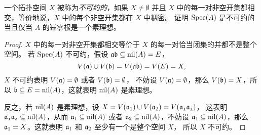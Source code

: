 \begin{problem}
  一个拓扑空间 $X$ 被称为\emph{不可约的}，如果 $X\neq\emptyset$ 并且 $X$
  中的每一对非空开集都相交，等价地说，$X$ 中的每个非空开集都在 $X$ 中稠密。
  证明 $\operatorname{Spec}(A)$ 是不可约的当且仅当 $A$ 的幂零根是一个素理想。
\end{problem}
\begin{proof}
  $X$ 中的每一对非空开集都相交等价于 $X$ 的每一对恰当闭集的并都不是整个空间。
  若 $\operatorname{Spec}(A)$ 不可约，假设 $\mathfrak{ab}\subseteq\operatorname{nil}(A)=E$，
  \[
    V(\mathfrak{a})\cup V(\mathfrak{b})=V(\mathfrak{ab})= V(E)=X,  
  \]
  $X$ 不可约表明 $V(\mathfrak{a})=\emptyset$ 或者 $V(\mathfrak{b})=\emptyset$，
  不妨设 $V(\mathfrak{a})=\emptyset$，那么 $V(\mathfrak{b})=X$，所以
  $\mathfrak{b}\subseteq E=\operatorname{nil}(A)$，这就表明 $\operatorname{nil}(A)$ 是素理想。

  反之，若 $\operatorname{nil}(A)$ 是素理想，设 $X=V(\mathfrak{a}_1)\cup V(\mathfrak{a}_2)=V(\mathfrak{\mathfrak{a}_1\mathfrak{a}_2})$，
  这表明 $\mathfrak{\mathfrak{a}_1\mathfrak{a}_2}\subseteq\operatorname{nil}(A)$，从而 $\mathfrak{a}_1\subseteq \operatorname{nil}(A)$ 或者
  $\mathfrak{a}_2\subseteq\operatorname{nil}(A)$，不妨设 $\mathfrak{a}_1\subseteq \operatorname{nil}(A)$，那么 
  $\mathfrak{a}_1=X$。这就表明 $\mathfrak{a}_1$ 和 $\mathfrak{a}_2$ 至少有一个是整个空间 $X$，
  所以 $X$ 不可约。
\end{proof}

